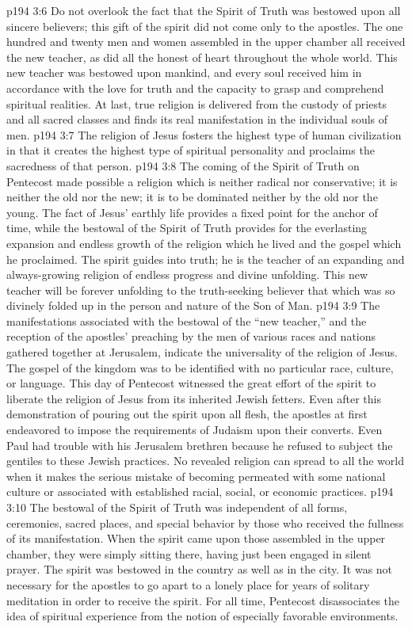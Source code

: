 \vs p194 3:6 \pc Do not overlook the fact that the Spirit of Truth was bestowed upon all sincere believers; this gift of the spirit did not come only to the apostles. The one hundred and twenty men and women assembled in the upper chamber all received the new teacher, as did all the honest of heart throughout the whole world. This new teacher was bestowed upon mankind, and every soul received him in accordance with the love for truth and the capacity to grasp and comprehend spiritual realities. At last, true religion is delivered from the custody of priests and all sacred classes and finds its real manifestation in the individual souls of men.
\vs p194 3:7 \pc The religion of Jesus fosters the highest type of human civilization in that it creates the highest type of spiritual personality and proclaims the sacredness of that person.
\vs p194 3:8 The coming of the Spirit of Truth on Pentecost made possible a religion which is neither radical nor conservative; it is neither the old nor the new; it is to be dominated neither by the old nor the young. The fact of Jesus’ earthly life provides a fixed point for the anchor of time, while the bestowal of the Spirit of Truth provides for the everlasting expansion and endless growth of the religion which he lived and the gospel which he proclaimed. The spirit guides into  truth; he is the teacher of an expanding and always\hyp{}growing religion of endless progress and divine unfolding. This new teacher will be forever unfolding to the truth\hyp{}seeking believer that which was so divinely folded up in the person and nature of the Son of Man.
\vs p194 3:9 The manifestations associated with the bestowal of the “new teacher,” and the reception of the apostles’ preaching by the men of various races and nations gathered together at Jerusalem, indicate the universality of the religion of Jesus. The gospel of the kingdom was to be identified with no particular race, culture, or language. This day of Pentecost witnessed the great effort of the spirit to liberate the religion of Jesus from its inherited Jewish fetters. Even after this demonstration of pouring out the spirit upon all flesh, the apostles at first endeavored to impose the requirements of Judaism upon their converts. Even Paul had trouble with his Jerusalem brethren because he refused to subject the gentiles to these Jewish practices. No revealed religion can spread to all the world when it makes the serious mistake of becoming permeated with some national culture or associated with established racial, social, or economic practices.
\vs p194 3:10 The bestowal of the Spirit of Truth was independent of all forms, ceremonies, sacred places, and special behavior by those who received the fullness of its manifestation. When the spirit came upon those assembled in the upper chamber, they were simply sitting there, having just been engaged in silent prayer. The spirit was bestowed in the country as well as in the city. It was not necessary for the apostles to go apart to a lonely place for years of solitary meditation in order to receive the spirit. For all time, Pentecost disassociates the idea of spiritual experience from the notion of especially favorable environments.
